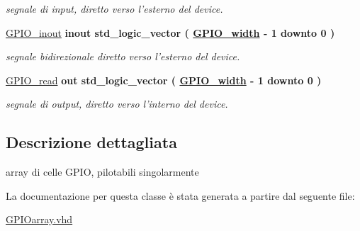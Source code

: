 \begin{DoxyCompactItemize}
\begin{DoxyCompactList}\small\item\em segnale di input, diretto verso l'esterno del device. \end{DoxyCompactList}\item 
\hypertarget{class_g_p_i_oarray_ga8829699d739ef35a4c5da396ffd38387}{\hyperlink{group___g_p_i_o-array_ga8829699d739ef35a4c5da396ffd38387}{G\+P\+I\+O\+\_\+inout}  {\bfseries {\bfseries \textcolor{vhdlchar}{inout}\textcolor{vhdlchar}{ }}} {\bfseries \textcolor{vhdlchar}{std\+\_\+logic\+\_\+vector}\textcolor{vhdlchar}{ }\textcolor{vhdlchar}{(}\textcolor{vhdlchar}{ }\textcolor{vhdlchar}{ }\textcolor{vhdlchar}{ }\textcolor{vhdlchar}{ }{\bfseries \hyperlink{group___g_p_i_o-array_ga0b52ca75e9a6093b2b60d5e851803069}{G\+P\+I\+O\+\_\+width}} \textcolor{vhdlchar}{-\/}\textcolor{vhdlchar}{ } \textcolor{vhdldigit}{1} \textcolor{vhdlchar}{ }\textcolor{vhdlchar}{downto}\textcolor{vhdlchar}{ }\textcolor{vhdlchar}{ } \textcolor{vhdldigit}{0} \textcolor{vhdlchar}{ }\textcolor{vhdlchar}{)}\textcolor{vhdlchar}{ }} }\label{class_g_p_i_oarray_ga8829699d739ef35a4c5da396ffd38387}

\begin{DoxyCompactList}\small\item\em segnale bidirezionale diretto verso l'esterno del device. \end{DoxyCompactList}\item 
\hypertarget{class_g_p_i_oarray_gafbe6792efd02cef42af7717592c1b04a}{\hyperlink{group___g_p_i_o-array_gafbe6792efd02cef42af7717592c1b04a}{G\+P\+I\+O\+\_\+read}  {\bfseries {\bfseries \textcolor{vhdlchar}{out}\textcolor{vhdlchar}{ }}} {\bfseries \textcolor{vhdlchar}{std\+\_\+logic\+\_\+vector}\textcolor{vhdlchar}{ }\textcolor{vhdlchar}{(}\textcolor{vhdlchar}{ }\textcolor{vhdlchar}{ }\textcolor{vhdlchar}{ }\textcolor{vhdlchar}{ }{\bfseries \hyperlink{group___g_p_i_o-array_ga0b52ca75e9a6093b2b60d5e851803069}{G\+P\+I\+O\+\_\+width}} \textcolor{vhdlchar}{-\/}\textcolor{vhdlchar}{ } \textcolor{vhdldigit}{1} \textcolor{vhdlchar}{ }\textcolor{vhdlchar}{downto}\textcolor{vhdlchar}{ }\textcolor{vhdlchar}{ } \textcolor{vhdldigit}{0} \textcolor{vhdlchar}{ }\textcolor{vhdlchar}{)}\textcolor{vhdlchar}{ }} }\label{class_g_p_i_oarray_gafbe6792efd02cef42af7717592c1b04a}

\begin{DoxyCompactList}\small\item\em segnale di output, diretto verso l'interno del device. \end{DoxyCompactList}\end{DoxyCompactItemize}


\subsection{Descrizione dettagliata}
array di celle G\+P\+I\+O, pilotabili singolarmente 

La documentazione per questa classe è stata generata a partire dal seguente file\+:\begin{DoxyCompactItemize}
\item 
\hyperlink{_g_p_i_oarray_8vhd}{G\+P\+I\+Oarray.\+vhd}\end{DoxyCompactItemize}
